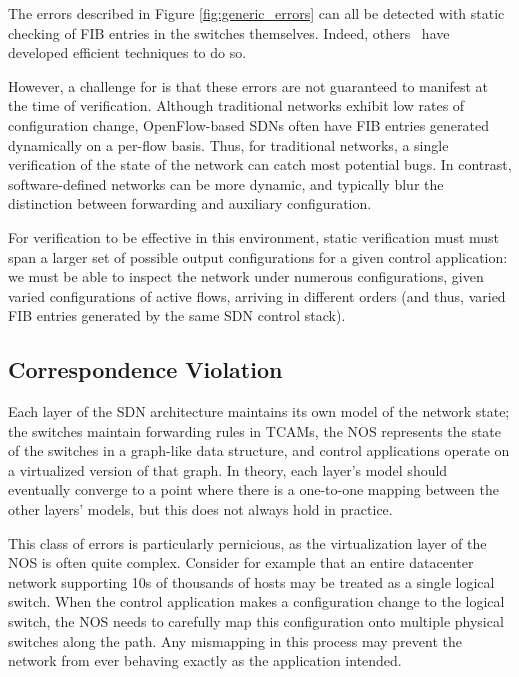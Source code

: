 The errors described in Figure \ref{fig:generic_errors} can all be detected with static checking
of FIB entries in the switches themselves.
Indeed, others~\cite{anteater} have developed efficient techniques to do so.


However, a challenge for \projectname{} is that these errors are not guaranteed to manifest 
at the time of verification.
Although traditional networks exhibit
low rates of configuration change, OpenFlow-based SDNs often have FIB entries generated dynamically on a per-flow basis. 
Thus, for traditional networks, a single verification of the
state of the network can catch most potential bugs. 
In contrast, software-defined networks can be more dynamic, and typically blur
the distinction between forwarding and auxiliary configuration.

For verification to be effective in this environment, static verification must
must span a larger set of possible output configurations for a given control
application: we must be able to inspect the network under numerous configurations, given varied configurations of active flows, arriving in different orders (and thus, varied FIB entries generated by the same SDN control stack).


\subsection{Correspondence Violation}
\label{sec:correspond}
Each layer of the SDN architecture
maintains its own model of the network state; the switches maintain forwarding
rules in TCAMs, the NOS represents the state of the switches in a graph-like data
structure, and control applications operate on 
a virtualized version of that graph. In theory, each layer's model should eventually
converge to a point where there is a one-to-one mapping 
between the other layers' models, but this does not always hold in practice.

This class of errors is particularly pernicious, as the 
virtualization layer of the NOS is often quite complex. Consider for example
that an entire datacenter network supporting 10s of thousands of hosts may be
treated as a single logical switch. When the control application makes a
configuration change to the logical switch, the NOS needs to carefully map this
configuration onto multiple physical switches along the path. Any mismapping in this
process may prevent the network from ever behaving exactly as the application intended.

